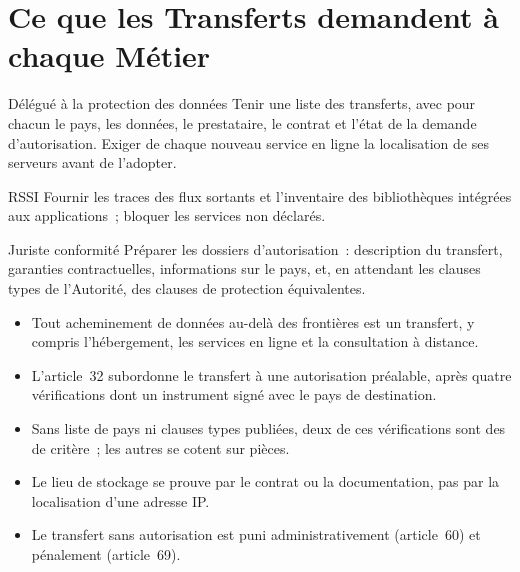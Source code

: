 \section{Ce que les Transferts demandent à chaque Métier}
\label{sec:c11-metiers}

\begin{boxmetier}{Délégué à la protection des données}
Tenir une liste des transferts, avec pour chacun le pays, les données, le
prestataire, le contrat et l'état de la demande d'autorisation. Exiger de
chaque nouveau service en ligne la localisation de ses serveurs avant de
l'adopter.
\end{boxmetier}

\begin{boxmetier}{RSSI}
Fournir les traces des flux sortants et l'inventaire des bibliothèques
intégrées aux applications~; bloquer les services non déclarés.
\end{boxmetier}

\begin{boxmetier}{Juriste conformité}
Préparer les dossiers d'autorisation~: description du transfert, garanties
contractuelles, informations sur le pays, et, en attendant les clauses
types de l'Autorité, des clauses de protection équivalentes.
\end{boxmetier}

\begin{boxresume}
\begin{itemize}
    \item Tout acheminement de données au-delà des frontières est un
          transfert, y compris l'hébergement, les services en ligne et la
          consultation à distance.
    \item L'article~32 subordonne le transfert à une autorisation préalable,
          après quatre vérifications dont un instrument signé avec le pays
          de destination.
    \item Sans liste de pays ni clauses types publiées, deux de ces
          vérifications sont des \NEK{} de critère~; les autres se cotent sur
          pièces.
    \item Le lieu de stockage se prouve par le contrat ou la documentation,
          pas par la localisation d'une adresse IP.
    \item Le transfert sans autorisation est puni administrativement
          (article~60) et pénalement (article~69).
\end{itemize}
\end{boxresume}

